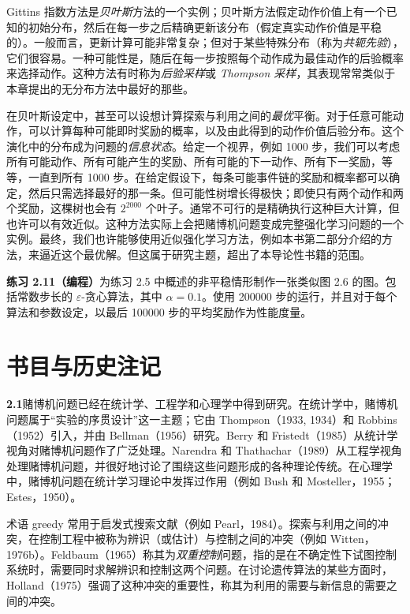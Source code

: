 \documentclass[UTF8,12pt,a4paper,fontset=fandol]{ctexart}
\begin{document}
Gittins 指数方法是\textit{贝叶斯}方法的一个实例；贝叶斯方法假定动作价值上有一个已知的初始分布，然后在每一步之后精确更新该分布（假定真实动作价值是平稳的）。一般而言，更新计算可能非常复杂；但对于某些特殊分布（称为\textit{共轭先验}），它们很容易。一种可能性是，随后在每一步按照每个动作成为最佳动作的后验概率来选择动作。这种方法有时称为\textit{后验采样}或 \textit{Thompson 采样}，其表现常常类似于本章提出的无分布方法中最好的那些。

在贝叶斯设定中，甚至可以设想计算探索与利用之间的\textit{最优}平衡。对于任意可能动作，可以计算每种可能即时奖励的概率，以及由此得到的动作价值后验分布。这个演化中的分布成为问题的\textit{信息状态}。给定一个视界，例如 1000 步，我们可以考虑所有可能动作、所有可能产生的奖励、所有可能的下一动作、所有下一奖励，等等，一直到所有 1000 步。在给定假设下，每条可能事件链的奖励和概率都可以确定，然后只需选择最好的那一条。但可能性树增长得极快；即使只有两个动作和两个奖励，这棵树也会有 $2^{2000}$ 个叶子。通常不可行的是精确执行这种巨大计算，但也许可以有效近似。这种方法实际上会把赌博机问题变成完整强化学习问题的一个实例。最终，我们也许能够使用近似强化学习方法，例如本书第二部分介绍的方法，来逼近这个最优解。但这属于研究主题，超出了本导论性书籍的范围。

\noindent\textbf{练习 2.11（编程）}\quad 为练习 2.5 中概述的非平稳情形制作一张类似图 2.6 的图。包括常数步长的 $\varepsilon$-贪心算法，其中 $\alpha=0.1$。使用 200000 步的运行，并且对于每个算法和参数设定，以最后 100000 步的平均奖励作为性能度量。

\section*{书目与历史注记}

\noindent\textbf{2.1}\quad 赌博机问题已经在统计学、工程学和心理学中得到研究。在统计学中，赌博机问题属于“实验的序贯设计”这一主题；它由 Thompson（1933, 1934）和 Robbins（1952）引入，并由 Bellman（1956）研究。Berry 和 Fristedt（1985）从统计学视角对赌博机问题作了广泛处理。Narendra 和 Thathachar（1989）从工程学视角处理赌博机问题，并很好地讨论了围绕这些问题形成的各种理论传统。在心理学中，赌博机问题在统计学习理论中发挥过作用（例如 Bush 和 Mosteller，1955；Estes，1950）。

术语 greedy 常用于启发式搜索文献（例如 Pearl，1984）。探索与利用之间的冲突，在控制工程中被称为辨识（或估计）与控制之间的冲突（例如 Witten，1976b）。Feldbaum（1965）称其为\textit{双重控制}问题，指的是在不确定性下试图控制系统时，需要同时求解辨识和控制这两个问题。在讨论遗传算法的某些方面时，Holland（1975）强调了这种冲突的重要性，称其为利用的需要与新信息的需要之间的冲突。
\end{document}
